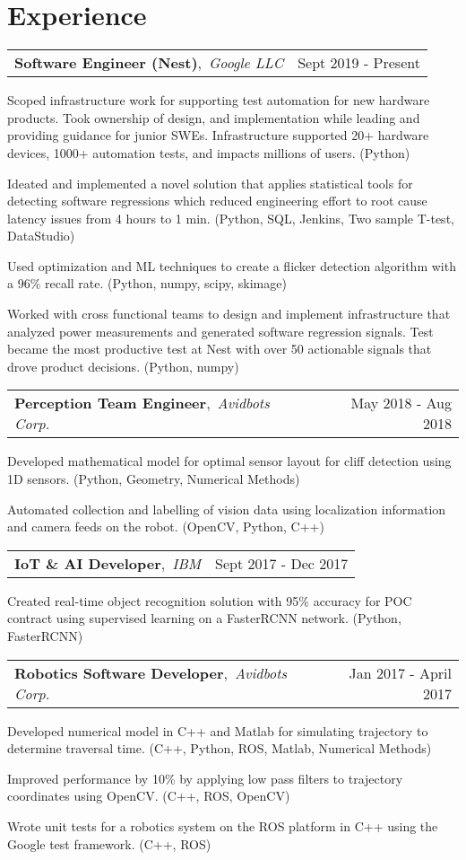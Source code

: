 \documentclass[a4paper]{article}
\makeatletter
\newcommand{\headeralgined}[2]{%
\normalfont%
\begin{tabular*}{\textwidth}{l@{\extracolsep{\fill}}r}%
  #1 & #2 \\%
\end{tabular*}%
\vspace{-6pt}%
}
\newcommand{\experience}[3]{%
  \headeralgined{%
    \textbf{#1},~\textit{#2}%
  }{#3}%
  \vspace{1pt}
}
\newcommand{\resumeitemstartlist}{\begin{itemize}[leftmargin=*]}
\newcommand{\resumeitemendlist}{\end{itemize}\vspace{2pt}}
\newcommand{\resumeitem}[1]{%
  \item{\normalsize{#1\vspace{-4pt}}}%
}
\newcommand{\tech}[1]{%
\textcolor{tealblue}{#1}%
}
\makeatother
\begin{document}

\section{Experience}


\experience{Software Engineer (Nest)}{Google LLC}{Sept 2019 - Present}
\resumeitemstartlist
{%
  \resumeitem{%
    Scoped infrastructure work for supporting test automation for new hardware products.
    Took ownership of design, and implementation while leading and providing guidance for junior SWEs.
    Infrastructure supported 20+ hardware devices, 1000+ automation tests, and impacts millions of users.
    \tech{(Python)}
  }
  \resumeitem{%
    Ideated and implemented a novel solution that applies statistical tools for detecting software
    regressions which reduced engineering effort to root cause latency issues from 4 hours to 1 min.
    \tech{(Python, SQL, Jenkins, Two sample T-test, DataStudio)}
  }
  \resumeitem{%
    Used optimization and ML techniques to create a flicker detection algorithm with a 96\% recall rate.
    \tech{(Python, numpy, scipy, skimage)}
  }
  \resumeitem{%
    Worked with cross functional teams to design and implement infrastructure that analyzed power measurements and generated software regression signals.
    Test became the most productive test at Nest with over 50 actionable signals that drove product decisions.
    \tech{(Python, numpy)}
  }
}
\resumeitemendlist


\experience{Perception Team Engineer}{Avidbots Corp.}{May 2018 - Aug 2018}
\resumeitemstartlist
{%
  \resumeitem{%
    Developed mathematical model for optimal sensor layout for cliff detection using 1D sensors.
    \tech{(Python, Geometry, Numerical Methods)}
  }
  \resumeitem{%
    Automated collection and labelling of vision data using localization information and camera feeds on the robot.
    \tech{(OpenCV, Python, C++)}
  }
}
\resumeitemendlist


\experience{IoT \& AI Developer}{IBM}{Sept 2017 - Dec 2017}
\resumeitemstartlist
{%
  \resumeitem{%
    Created real-time object recognition solution with 95\% accuracy for POC contract using
    supervised learning on a FasterRCNN network.
    \tech{(Python, FasterRCNN)}
  }
}
\resumeitemendlist


\experience{Robotics Software Developer}{Avidbots Corp.}{Jan 2017 - April 2017}
\resumeitemstartlist
{%
  \resumeitem{%
    Developed numerical model in C++ and Matlab for simulating trajectory to determine traversal time.
    \tech{(C++, Python, ROS, Matlab, Numerical Methods)}
  }
  \resumeitem{%
    Improved performance by 10\% by applying low pass filters to trajectory coordinates using OpenCV.
    \tech{(C++, ROS, OpenCV)}
  }
  \resumeitem{%
    Wrote unit tests for a robotics system on the ROS platform in C++ using the Google test framework.
    \tech{(C++, ROS)}
  }
}
\resumeitemendlist
\end{document}
